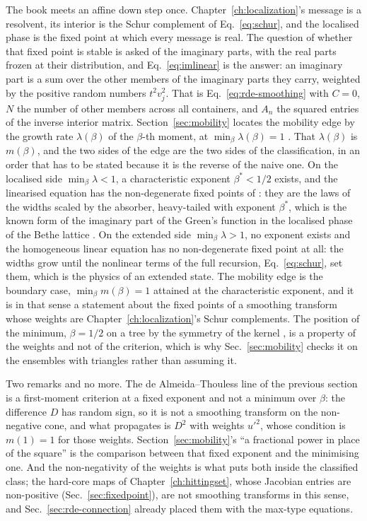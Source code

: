 The book meets an affine down step once. Chapter~\ref{ch:localization}'s
message is a resolvent, its interior is the Schur complement of
Eq.~\eqref{eq:schur}, and the localised phase is the fixed point at which
every message is real. The question of whether that fixed point is stable
is asked of the imaginary parts, with the real parts frozen at their
distribution, and Eq.~\eqref{eq:imlinear} is the answer: an imaginary part
is a sum over the other members of the imaginary parts they carry,
weighted by the positive random numbers $t^{2}v_{j}^{2}$. That is
Eq.~\eqref{eq:rde-smoothing} with $C=0$, $N$ the number of other members
across all containers, and $A_{n}$ the squared entries of the inverse
interior matrix. Section~\ref{sec:mobility} locates the mobility edge by
the growth rate $\lambda(\beta)$ of the $\beta$-th moment, at
$\min_{\beta}\lambda(\beta)=1$ \citep{abouchacra1973}. That
$\lambda(\beta)$ is $m(\beta)$, and the two sides of the edge are the two
sides of the classification, in an order that has to be stated because it
is the reverse of the naive one. On the localised side
$\min_{\beta}\lambda<1$, a characteristic exponent $\beta^{*}<1/2$ exists,
and the linearised equation has the non-degenerate fixed points of
\citeauthor{alsmeyer2012}: they are the laws of the widths scaled by the
absorber, heavy-tailed with exponent $\beta^{*}$, which is the known form
of the imaginary part of the Green's function in the localised phase of
the Bethe lattice \citep{abouchacra1973,mirlin1991}. On the extended side
$\min_{\beta}\lambda>1$, no exponent exists and the homogeneous linear
equation has no non-degenerate fixed point at all: the widths grow until
the nonlinear terms of the full recursion, Eq.~\eqref{eq:schur}, set them,
which is the physics of an extended state. The mobility edge is the
boundary case, $\min_{\beta}m(\beta)=1$ attained at the characteristic
exponent, and it is in that sense a statement about the fixed points of a
smoothing transform whose weights are Chapter~\ref{ch:localization}'s
Schur complements. The position of the minimum, $\beta=1/2$ on a tree by the symmetry of the kernel
\citep{mirlin1991}, is a property of the weights and not of the criterion,
which is why Sec.~\ref{sec:mobility} checks it on the ensembles with
triangles rather than assuming it.

Two remarks and no more. The de Almeida--Thouless line of the previous
section is a first-moment criterion at a fixed exponent and not a minimum
over $\beta$: the difference $D$ has random sign, so it is not a smoothing
transform on the non-negative cone, and what propagates is $D^{2}$ with
weights $u'^{2}$, whose condition is $m(1)=1$ for those weights.
Section~\ref{sec:mobility}'s ``a fractional power in place of the square''
is the comparison between that fixed exponent and the minimising one. And
the non-negativity of the weights is what puts both inside the classified
class; the hard-core maps of Chapter~\ref{ch:hittingset}, whose Jacobian
entries are non-positive (Sec.~\ref{sec:fixedpoint}), are not smoothing
transforms in this sense, and Sec.~\ref{sec:rde-connection} already placed
them with the max-type equations.

